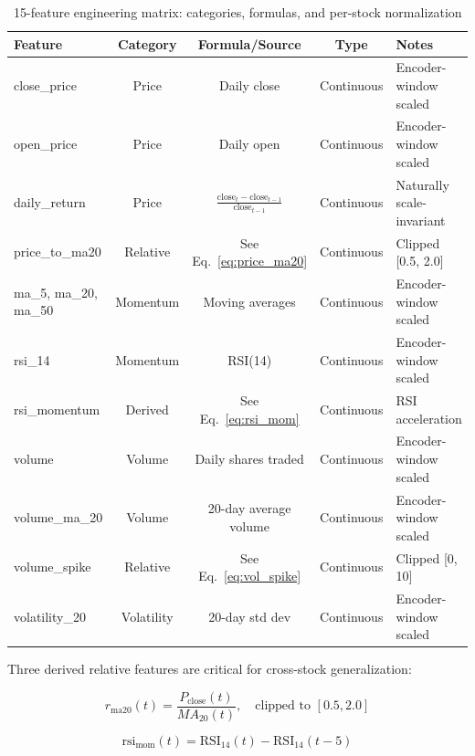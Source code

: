 \documentclass[conference]{IEEEtran}
\begin{document}
\begin{table}[htbp]
\centering
\caption{15-feature engineering matrix: categories, formulas, and per-stock normalization}
\label{tab:features}
\scriptsize
\setlength{\tabcolsep}{2.5pt}
\begin{tabular}{lcccl}
\toprule
\textbf{Feature} & \textbf{Category} & \textbf{Formula/Source} & \textbf{Type} & \textbf{Notes} \\
\midrule
close\_price & Price & Daily close & Continuous & Encoder-window scaled \\
open\_price & Price & Daily open & Continuous & Encoder-window scaled \\
daily\_return & Price & $\frac{\text{close}_t - \text{close}_{t-1}}{\text{close}_{t-1}}$ & Continuous & Naturally scale-invariant \\
price\_to\_ma20 & Relative & See Eq.~\ref{eq:price_ma20} & Continuous & Clipped [0.5, 2.0] \\
ma\_5, ma\_20, ma\_50 & Momentum & Moving averages & Continuous & Encoder-window scaled \\
rsi\_14 & Momentum & RSI(14) & Continuous & Encoder-window scaled \\
rsi\_momentum & Derived & See Eq.~\ref{eq:rsi_mom} & Continuous & RSI acceleration \\
volume & Volume & Daily shares traded & Continuous & Encoder-window scaled \\
volume\_ma\_20 & Volume & 20-day average volume & Continuous & Encoder-window scaled \\
volume\_spike & Relative & See Eq.~\ref{eq:vol_spike} & Continuous & Clipped [0, 10] \\
volatility\_20 & Volatility & 20-day std dev & Continuous & Encoder-window scaled \\
\bottomrule
\end{tabular}
\normalsize
\end{table}

Three derived relative features are critical for cross-stock generalization:

\begin{equation}
r_{\text{ma20}}(t) = \frac{P_{\text{close}}(t)}{MA_{20}(t)}, \quad \text{clipped to } [0.5, 2.0]
\label{eq:price_ma20}
\end{equation}

\begin{equation}
\text{rsi}_{\text{mom}}(t) = \text{RSI}_{14}(t) - \text{RSI}_{14}(t-5)
\label{eq:rsi_mom}
\end{equation}
\end{document}
